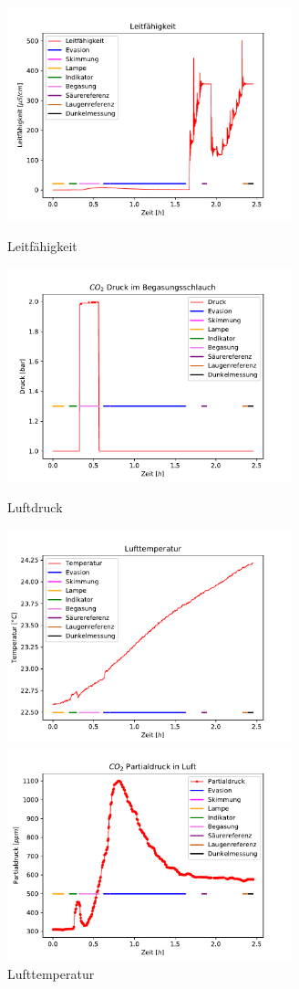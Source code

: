 \documentclass[12pt]{article}
\begin{document}
\begin{figure}[H]
	\centering
	\parbox{82.5mm}{
		\centering
		\includegraphics[width=82.5mm]{VE-Wasser/Leitfaehigkeit}
		\caption{Leitf\"ahigkeit \label{fig: VE-Wasser}}
	}
	\hfill%
	\parbox{82.5mm}{
		\centering
		\includegraphics[width=82.5mm]{VE-Wasser/Luftdruck}
		\caption{Luftdruck}
	}
	\centering
	\parbox{82.5mm}{
		\centering
		\includegraphics[width=82.5mm]{VE-Wasser/Lufttemperatur}
		\caption{Lufttemperatur}
	}
	\hfill%
	\parbox{82.5mm}{
		\centering
		\includegraphics[width=82.5mm]{VE-Wasser/Partialdruck}
}
\end{figure}
\end{document}
